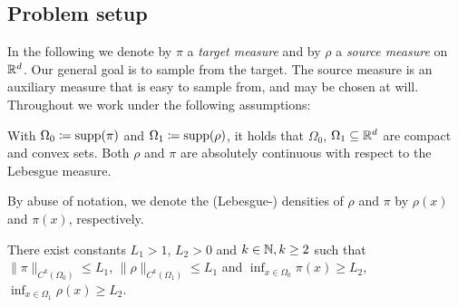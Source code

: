 \subsection{Problem setup}\label{sec:setup}
In the following we denote by $\pi$ a \emph{target measure} and
  by $\rho$ a \emph{source measure} on $\mathbb{R}^d$. Our general goal is to
  sample from the target. The source measure is an auxiliary measure
  that is easy to sample from, and may be chosen at will. Throughout we
  work under the following assumptions:


\begin{assumption}\label{ass:dens1}
  With $\Omega_0 \coloneqq {\rm supp}(\pi)$ and
  $\Omega_1 \coloneqq {\rm supp}(\rho)$, it holds that $\Omega_0$,
  $\Omega_1\subseteq\mathbb{R}^d$ are compact and convex sets. Both $\rho$
  and $\pi$ are absolutely continuous with respect to the Lebesgue
  measure.
\end{assumption}

By abuse of notation, we denote the (Lebesgue-) densities of $\rho$
and $\pi$ by $\rho(x)$ and $\pi(x)$, respectively.
  
\begin{assumption}[regularity]\label{ass:dens2}
  There exist constants $L_1 > 1$, $L_2>0$ and $k\in\mathbb{N}, k \geq 2$ such that
  $\|\pi\|_{C^k(\Omega_0)} \leq L_1$, $\|\rho\|_{C^k(\Omega_1)} \leq L_1$ and  $\inf_{x\in\Omega_0}\pi(x) \geq L_2$, $\inf_{x\in\Omega_1}\rho(x) \geq L_2$. 
\end{assumption}




